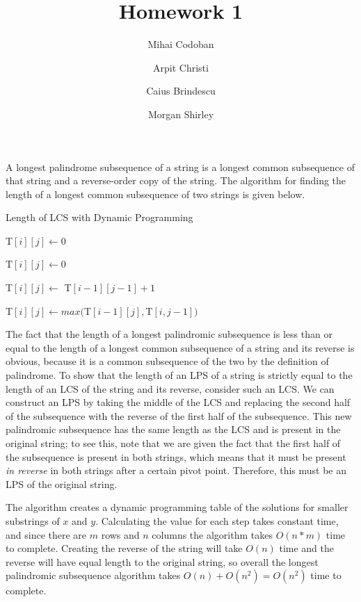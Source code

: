 \documentclass{article}
\title{Homework 1}
\author{Mihai Codoban \and Arpit Christi \and Caius Brindescu \and Morgan Shirley}
\begin{document}
\maketitle





A longest palindrome subsequence of a string is a longest common subsequence of that string and a reverse-order copy of the string. The algorithm for finding the length of a longest common subsequence of two strings is given below.

\begin{algorithm}
	\caption{Length of LCS with Dynamic Programming}
	\begin{algorithmic}


		

				 \State T$[i][j] \gets 0$

				 \State T$[i][j] \gets 0$

				 \State T$[i][j] \gets$ T$[i-1][j-1] + 1$

				\Else \State T$[i][j] \gets max($T$[i-1][j], $T$[i, j-1])$

				\EndIf

			\EndFor

		\EndFor

	  \EndFunction
	\end{algorithmic}
\end{algorithm}


The fact that the length of a longest palindromic subsequence is less than or equal to the length of a longest common subsequence of a string and its reverse is obvious, because it is a common subsequence of the two by the definition of palindrome. To show that the length of an LPS of a string is strictly equal to the length of an LCS of the string and its reverse, consider such an LCS. We can construct an LPS by taking the middle of the LCS and replacing the second half of the subsequence with the reverse of the first half of the subsequence. This new palindromic subsequence has the same length as the LCS and is present in the original string; to see this, note that we are given the fact that the first half of the subsequence is present in both strings, which means that it must be present \emph{in reverse} in both strings after a certain pivot point. Therefore, this must be an LPS of the original string.

The algorithm creates a dynamic programming table of the solutions for smaller substrings of $x$ and $y$. Calculating the value for each step takes constant time, and since there are $m$ rows and $n$ columns the algorithm takes $O(n*m)$ time to complete. Creating the reverse of the string will take $O(n)$ time and the reverse will have equal length to the original string, so overall the longest palindromic subsequence algorithm takes $O(n) + O(n^2) = O(n^2)$ time to complete.

\end{document}

